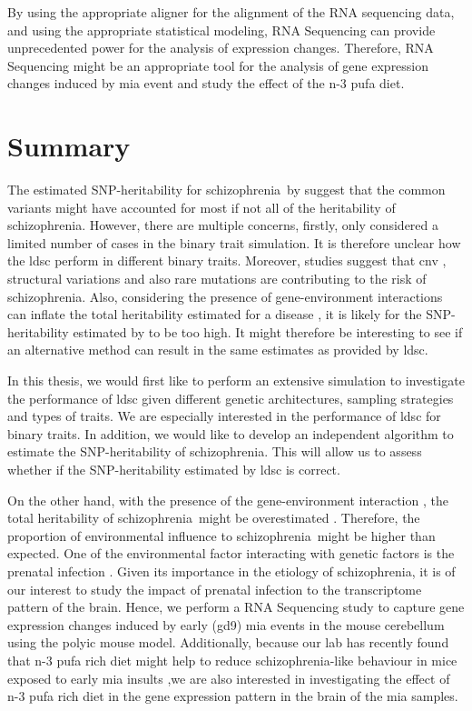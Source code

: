 \documentclass[12pt]{scrbook}
\newcommand*{\scz}{schizophrenia}
\begin{document}
By using the appropriate aligner for the alignment of the RNA sequencing data, and using the appropriate statistical modeling, RNA Sequencing can provide unprecedented power for the analysis of expression changes.
Therefore, RNA Sequencing might be an appropriate tool for the analysis of gene expression changes induced by \gls{mia} event and study the effect of the n-3 \gls{pufa} diet. 

\section{Summary}
The estimated \gls{SNP}-heritability for \scz\ by \citet{Bulik-Sullivan2015} suggest that the common variants might have accounted for most if not all of the heritability of \scz.
However, there are multiple concerns, firstly, \citet{Bulik-Sullivan2015} only considered a limited number of cases in the binary trait simulation. 
It is therefore unclear how the \gls{ldsc} perform in different binary traits.
Moreover, studies suggest that \gls{cnv} \citep{Szatkiewicz2014}, structural variations \citep{Walsh2008} and also rare mutations \citep{purcell2014polygenic} are contributing to the risk of \scz.
Also, considering the presence of gene-environment interactions can inflate the total heritability estimated for a disease \citet{zuk2012mystery}, it is likely for the \gls{SNP}-heritability estimated by \citet{Bulik-Sullivan2015} to be too high.
It might therefore be interesting to see if an alternative method can result in the same estimates  as provided by \gls{ldsc}.

In this thesis, we would first like to perform an extensive simulation to investigate the performance of \gls{ldsc} given different genetic architectures, sampling strategies and types of traits. 
We are especially interested in the performance of \gls{ldsc} for binary traits. 
In addition, we would like to develop an independent algorithm to estimate the \gls{SNP}-heritability of \scz.
This will allow us to assess whether if the \gls{SNP}-heritability estimated by \gls{ldsc} is correct.

On the other hand, with the presence of the gene-environment interaction \citep{Tienari2004,Clarke2009}, the total heritability of \scz\ might be overestimated \citet{zuk2012mystery}.
Therefore, the proportion of environmental influence to \scz\ might be higher than expected.
One of the environmental factor interacting with genetic factors is the prenatal infection \citet{Clarke2009}.
Given its importance in the etiology of \scz, it is of our interest to study the impact of prenatal infection to the transcriptome pattern of the brain.
Hence, we perform a RNA Sequencing study to capture gene expression changes induced by early (\gls{gd}9) \gls{mia} events in the mouse cerebellum using the \gls{polyic} mouse model.
Additionally, because our lab has recently found that n-3 \gls{pufa} rich diet might help to reduce \scz-like behaviour in mice exposed to early \gls{mia} insults \citep{Li2015},we are also interested in investigating the effect of n-3 \gls{pufa} rich diet in the gene expression pattern in the brain of the \gls{mia} samples. 
\end{document}
